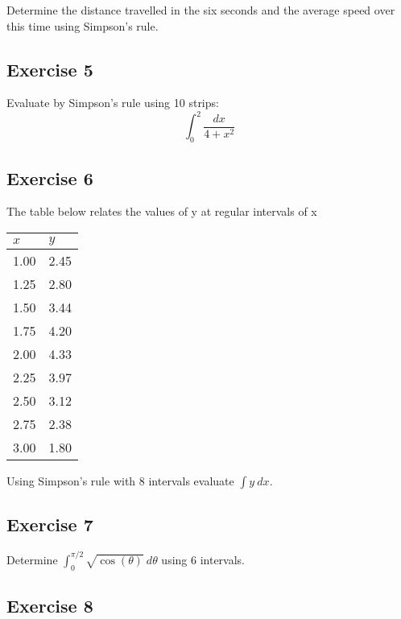 \documentclass[
  11pt,
  oneside]{book}
\newcommand{\slide}{}
\theoremstyle{definition}
\theoremstyle{definition}
\theoremstyle{definition}
\theoremstyle{definition}
\theoremstyle{remark}
\begin{document}
Determine the distance travelled in the six seconds and the average speed over this time using
Simpson's rule.

\slide

\subsection*{Exercise 5}\label{exercise-5-3}

Evaluate by Simpson's rule using 10 strips:
\[
\int_0^2\frac{dx}{4+x^2}
\]

\slide

\subsection*{Exercise 6}\label{exercise-6-3}

The table below relates the values of y at regular intervals of x

\begin{tabular}{l|l}
\hline
$x$ & $y$\\
\hline
1.00 & 2.45\\
\hline
1.25 & 2.80\\
\hline
1.50 & 3.44\\
\hline
1.75 & 4.20\\
\hline
2.00 & 4.33\\
\hline
2.25 & 3.97\\
\hline
2.50 & 3.12\\
\hline
2.75 & 2.38\\
\hline
3.00 & 1.80\\
\hline
\end{tabular}

Using Simpson's rule with 8 intervals evaluate \(\displaystyle\int y\ dx\).

\slide

\subsection*{Exercise 7}\label{exercise-7-1}

Determine \(\displaystyle\int_0^{\pi/2}\sqrt{\cos(\theta)}\ d\theta\) using 6 intervals.

\slide

\subsection*{Exercise 8}\label{exercise-8}
\end{document}
